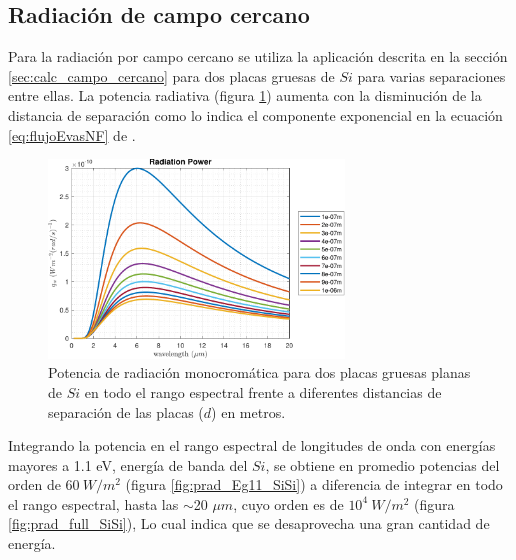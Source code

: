 \subsection{Radiación de campo cercano}
Para la radiación por campo cercano se utiliza la aplicación descrita en la sección \ref{sec:calc_campo_cercano} para dos placas gruesas de $Si$ para varias separaciones entre ellas. La potencia radiativa (figura \ref{fig:rad_SiSi_ds}) aumenta con la disminución de la distancia de separación como lo indica el componente exponencial en la ecuación \eqref{eq:flujoEvasNF} de \cite{nfTPV_equations}.
\begin{figure}[H]
	\centering
		\includegraphics[width=0.7\textwidth]{figuras/Resultados/radiacion/SiSi_ds.pdf}
	\caption{Potencia de radiación monocromática para dos placas gruesas planas de $Si$ en todo el rango espectral frente a diferentes distancias de separación de las placas ($d$) en metros.}
	\label{fig:rad_SiSi_ds}
\end{figure}
Integrando la potencia en el rango espectral de longitudes de onda con energías mayores a 1.1 eV, energía de banda del $Si$, se obtiene en promedio potencias del orden de $60 \ W/m^2$ (figura \ref{fig:prad_Eg11_SiSi}) a diferencia de integrar en todo el rango espectral, hasta las $\sim$20 $\mu m$, cuyo orden es de $10^4 \ W/m^2$ (figura \ref{fig:prad_full_SiSi}), Lo cual indica que se desaprovecha una gran cantidad de energía.
